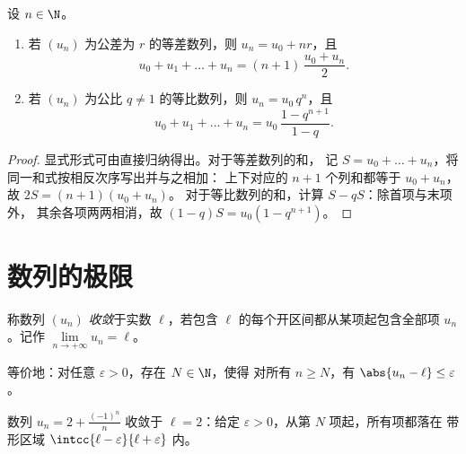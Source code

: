 \begin{proposition}[通项公式与求和]\label{prop:g12:seq:arith-geom}
设 $n \in \N$。
\begin{enumerate}
  \item 若 $(u_n)$ 为公差为 $r$ 的等差数列，则
        $u_n = u_0 + nr$，且
        \[
        u_0 + u_1 + \dots + u_n = (n+1)\,\frac{u_0 + u_n}{2}.
        \]
  \item 若 $(u_n)$ 为公比 $q \neq 1$ 的等比数列，则
        $u_n = u_0\, q^n$，且
        \[
        u_0 + u_1 + \dots + u_n = u_0\,\frac{1 - q^{n+1}}{1 - q}.
        \]
\end{enumerate}
\end{proposition}

\begin{proof}
显式形式可由直接归纳得出。对于等差数列的和，
记 $S = u_0 + \dots + u_n$，将同一和式按相反次序写出并与之相加：
上下对应的 $n+1$ 个列和都等于 $u_0 + u_n$，故 $2S = (n+1)(u_0+u_n)$。
对于等比数列的和，计算 $S - qS$：除首项与末项外，
其余各项两两相消，故 $(1-q)S = u_0(1 - q^{n+1})$。
\end{proof}

\section{数列的极限}

\begin{definition}[收敛数列]\label{def:g12:seq:limit}
称数列 $(u_n)$ \emph{收敛}于实数
$\ell$，若包含 $\ell$ 的每个开区间都从某项起包含全部项
$u_n$。记作 $\lim\limits_{n\to+\infty} u_n = \ell$。

等价地：对任意 $\varepsilon > 0$，存在 $N \in \N$，使得
对所有 $n \geq N$，有 $\abs{u_n - \ell} \leq \varepsilon$。
\end{definition}

\begin{omfigure}

{\small 数列 $u_n = 2 + \frac{(-1)^n}{n}$ 收敛于 $\ell = 2$：给定
$\varepsilon > 0$，从第 $N$ 项起，所有项都落在
带形区域 $\intcc{\ell-\varepsilon}{\ell+\varepsilon}$ 内。}
\end{omfigure}

